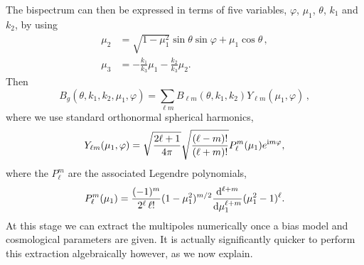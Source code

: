 The bispectrum can then be expressed in terms of five variables, \(\varphi\), \(\mu_1\), \(\theta\), \(k_1\) and \(k_2\), by using
\begin{align}
	\mu_2 &= \sqrt{1-\mu_1^2} \sin\theta \sin\varphi + \mu_1\cos\theta\,,  \\
	\mu_3 &= -\frac{k_1}{k_3}\mu_1 - \frac{k_2}{k_3}\mu_2.
\end{align}
Then 
\begin{equation}\label{eq:bgexpv1}
	B_g(\theta, k_1, k_2, \mu_1, \varphi) = \sum_{\ell m} B_{\ell m}(\theta, k_1, k_2) Y_{\ell m} (\mu_1, \varphi)\,,
\end{equation}
where we use standard orthonormal spherical harmonics,
\begin{equation}
	Y_{\ell m}(\mu_1,\varphi) = \sqrt{\frac{2\ell+1}{4 \pi}} \sqrt{\frac{(\ell-m)!}{(\ell+m)!}} P_\ell^m(\mu_1) e^{{\rm i} m \varphi},
\end{equation}
where the \(P_\ell ^m\) are the associated Legendre polynomials, 
\begin{equation}
	P_\ell ^m(\mu_1) = \frac{(-1)^m}{2^\ell \,\ell !} (1-\mu_1^2)^{m/2} \frac{{\rm d}^{\ell +m}}{{\rm d}\mu_1^{\ell +m}}(\mu_1^2 - 1)^\ell . 
\end{equation}
At this stage we can extract the multipoles numerically once a bias model and cosmological parameters are given. It is actually significantly quicker to perform this extraction algebraically however, as we now explain. 

